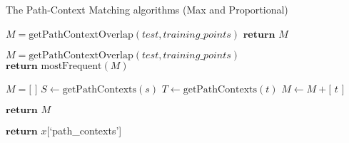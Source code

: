 \begin{algorithm}
    \caption{The Path-Context Matching algorithms (Max and Proportional) }
    \label{alg:context_algorithm}
    \begin{algorithmic}
        \State ${M} = \text{getPathContextOverlap}(test, training\_points)$
        \State $\textbf{return } M$
        \EndProcedure
    \end{algorithmic}
    \hrulefill
    \begin{algorithmic}
        \State ${M} = \text{getPathContextOverlap}(test, training\_points)$
        \State $\textbf{return } \text{mostFrequent}(M)$
        \EndProcedure
    \end{algorithmic}
    \hrulefill
    \begin{algorithmic}
        \State ${M} = \textbf{[ ]}$
        \State ${S} \gets \text{getPathContexts}(s)$
            \State ${T} \gets \text{getPathContexts}(t)$
                    \State $ {M} \gets  {M} + \text{[ }t\text{ ]}$
                     
                \EndFor
        \EndFor
        \State $\textbf{return } M$
        \EndProcedure
    \end{algorithmic}
    \hrulefill
    \begin{algorithmic}
        \State $\textbf{return } x$[`path\_contexts']
        \EndProcedure
    \end{algorithmic}

\end{algorithm}



